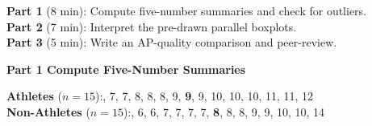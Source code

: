 \documentclass[10pt]{article}
\begin{document}

\vspace{0.10in}

\begin{tcolorbox}[colback=sky, colframe=navy, boxrule=0.8pt, arc=2mm,
    left=3mm, right=3mm, top=2mm, bottom=2mm]
\small
\textbf{Part 1} (8 min): Compute five-number summaries and check for outliers.\\
\textbf{Part 2} (7 min): Interpret the pre-drawn parallel boxplots.\\
\textbf{Part 3} (5 min): Write an AP-quality comparison and peer-review.
\end{tcolorbox}

\vspace{0.10in}

{\large\bfseries\color{navy} Part 1 \quad Compute Five-Number Summaries}

\vspace{0.08in}

\noindent\small
\textbf{Athletes} ($n=15$):, 7, 7, 8, 8, 8, 9, \textbf{9}, 9, 10, 10, 10, 11, 11, 12\\[3pt]
\textbf{Non-Athletes} ($n=15$):, 6, 6, 7, 7, 7, 7, \textbf{8}, 8, 8, 9, 9, 10, 10, 14

\vspace{0.10in}
\end{document}
